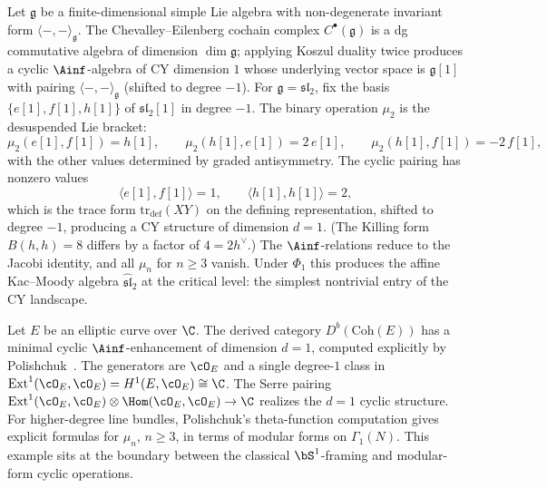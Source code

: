 \begin{example}[\texorpdfstring{$d = 1$}{d = 1}: \texorpdfstring{$\mathfrak{sl}_2$}{sl-2} as cyclic \texorpdfstring{$\Ainf$}{A-inf}-algebra]
\label{ex:cy1-sl2}
Let $\mathfrak{g}$ be a finite-dimensional simple Lie algebra with non-degenerate invariant form $\langle -, - \rangle_{\mathfrak{g}}$. The Chevalley--Eilenberg cochain complex $C^\bullet(\mathfrak{g})$ is a dg commutative algebra of dimension $\dim \mathfrak{g}$; applying Koszul duality twice produces a cyclic $\Ainf$-algebra of CY dimension $1$ whose underlying vector space is $\mathfrak{g}[1]$ with pairing $\langle -, - \rangle_{\mathfrak{g}}$ (shifted to degree $-1$). For $\mathfrak{g} = \mathfrak{sl}_2$, fix the basis $\{e[1], f[1], h[1]\}$ of $\mathfrak{sl}_2[1]$ in degree $-1$. The binary operation $\mu_2$ is the desuspended Lie bracket:
\[
 \mu_2(e[1], f[1]) = h[1], \qquad \mu_2(h[1], e[1]) = 2\, e[1], \qquad \mu_2(h[1], f[1]) = -2\, f[1],
\]
with the other values determined by graded antisymmetry. The cyclic pairing has nonzero values
\[
 \langle e[1], f[1] \rangle = 1, \qquad \langle h[1], h[1] \rangle = 2,
\]
which is the trace form $\mathrm{tr}_{\mathrm{def}}(XY)$ on the defining representation, shifted to degree $-1$, producing a CY structure of dimension $d = 1$. (The Killing form $B(h,h) = 8$ differs by a factor of $4 = 2 h^\vee$.) The $\Ainf$-relations reduce to the Jacobi identity, and all $\mu_n$ for $n \geq 3$ vanish. Under $\Phi_1$ this produces the affine Kac--Moody algebra $\widehat{\mathfrak{sl}}_2$ at the critical level: the simplest nontrivial entry of the CY landscape.
\end{example}

\begin{example}[\texorpdfstring{$d = 1$}{d = 1} from an elliptic curve]
\label{ex:cy1-elliptic}
Let $E$ be an elliptic curve over $\C$. The derived category $D^b(\mathrm{Coh}(E))$ has a minimal cyclic $\Ainf$-enhancement of dimension $d = 1$, computed explicitly by Polishchuk~\cite{Polishchuk2011}. The generators are $\cO_E$ and a single degree-$1$ class in $\mathrm{Ext}^1(\cO_E, \cO_E) = H^1(E, \cO_E) \cong \C$. The Serre pairing $\mathrm{Ext}^1(\cO_E, \cO_E) \otimes \Hom(\cO_E, \cO_E) \to \C$ realizes the $d = 1$ cyclic structure. For higher-degree line bundles, Polishchuk's theta-function computation gives explicit formulas for $\mu_n$, $n \geq 3$, in terms of modular forms on $\Gamma_1(N)$. This example sits at the boundary between the classical $\bS^1$-framing and modular-form cyclic operations.
\end{example}

